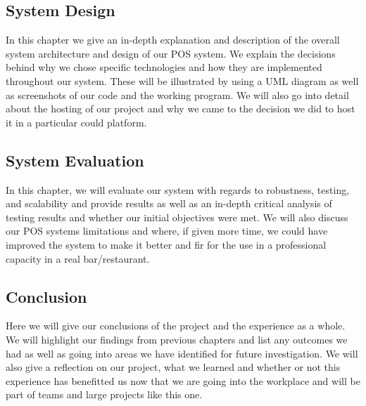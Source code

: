 \subsection{System Design}
In this chapter we give an in-depth explanation and description of the overall system architecture and design of our POS system. We explain the decisions behind why we chose specific technologies and how they are implemented throughout our system. These will be illustrated by using a UML diagram as well as screenshots of our code and the working program.
We will also go into detail about the hosting of our project and why we came to the decision we did to host it in a particular could platform.

\subsection{System Evaluation}
In this chapter, we will evaluate our system with regards to robustness, testing, and scalability and provide results as well as an in-depth critical analysis of testing results and whether our initial objectives were met.
We will also discuss our POS systems limitations and where, if given more time, we could have improved the system to make it better and fir for the use in a professional capacity in a real bar/restaurant.

\subsection{Conclusion}
Here we will give our conclusions of the project and the experience as a whole. We will highlight our findings from previous chapters and list any outcomes we had as well as going into areas we have identified for future investigation. We will also give a reflection on our project, what we learned and whether or not this experience has benefitted us now that we are going into the workplace and will be part of teams and large projects like this one.\newpage
